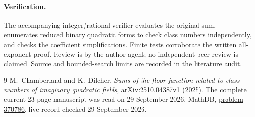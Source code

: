\documentclass[11pt]{article}
\begin{document}
\paragraph{Verification.}
The accompanying integer/rational verifier evaluates the original sum,
enumerates reduced binary quadratic forms to check class numbers
independently, and checks the coefficient simplifications. Finite tests
corroborate the written all-exponent proof. Review is by the author-agent;
no independent peer review is claimed. Source and bounded-search limits
are recorded in the literature audit.

\begin{thebibliography}{9}
 M.~Chamberland and K.~Dilcher,
\emph{Sums of the floor function related to class numbers of imaginary
quadratic fields},
\href{https://arxiv.org/abs/2510.04387}{arXiv:2510.04387v1} (2025).
The complete current 23-page manuscript was read on 29 September 2026.
 MathDB,
\href{https://mathdb.com/p/370786}{problem 370786},
live record checked 29 September 2026.
\end{thebibliography}
\end{document}
